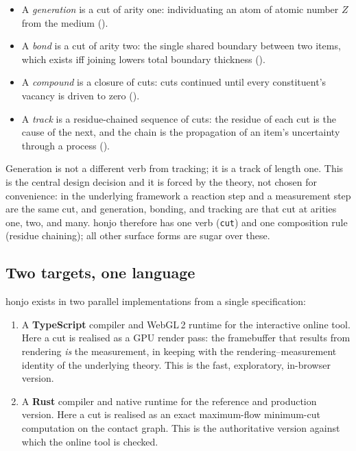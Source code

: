 \documentclass[11pt,a4paper]{article}
\theoremstyle{thmstyle}
\theoremstyle{definition}
\theoremstyle{remark}
\newcommand{\hj}[1]{\texttt{#1}}
\begin{document}
\begin{itemize}[leftmargin=1.4em,itemsep=2pt]
\item A \emph{generation} is a cut of arity one: individuating an atom of
atomic number $Z$ from the medium ().
\item A \emph{bond} is a cut of arity two: the single shared boundary
between two items, which exists iff joining lowers total boundary
thickness ().
\item A \emph{compound} is a closure of cuts: cuts continued until every
constituent's vacancy is driven to zero ().
\item A \emph{track} is a residue-chained sequence of cuts: the residue
of each cut is the cause of the next, and the chain is the propagation of
an item's uncertainty through a process ().
\end{itemize}

Generation is not a different verb from tracking; it is a track of length
one. This is the central design decision and it is forced by the theory,
not chosen for convenience: in the underlying framework a reaction step
and a measurement step are the same cut, and generation, bonding, and
tracking are that cut at arities one, two, and many. honjo therefore has
one verb (\hj{cut}) and one composition rule (residue chaining); all
other surface forms are sugar over these.

\subsection{Two targets, one language}

honjo exists in two parallel implementations from a single specification:

\begin{enumerate}[leftmargin=1.6em,itemsep=2pt]
\item A \textbf{TypeScript} compiler and WebGL\,2 runtime for the
interactive online tool. Here a cut is realised as a GPU render pass: the
framebuffer that results from rendering \emph{is} the measurement, in
keeping with the rendering--measurement identity of the underlying
theory. This is the fast, exploratory, in-browser version.
\item A \textbf{Rust} compiler and native runtime for the reference and
production version. Here a cut is realised as an exact maximum-flow
minimum-cut computation on the contact graph. This is the
authoritative version against which the online tool is checked.
\end{enumerate}
\end{document}
